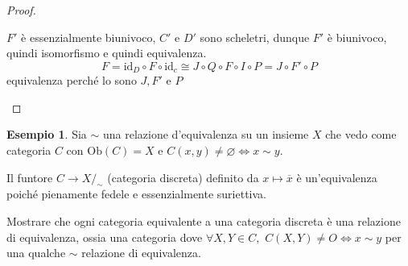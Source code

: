\documentclass[notitlepage]{report}
\newcounter{theo}[section]\setcounter{theo}{0}
\newcounter{excounter}[section]\setcounter{excounter}{0}
\numberwithin{equation}{section}
\theoremstyle{plain}
\theoremstyle{definition}
\newtheorem{example}[excounter]{Esempio}
\theoremstyle{remark}
\begin{document}
\begin{proof}
\begin{itemize}
    \(F'\) è essenzialmente biunivoco, \(C'\) e \(D'\) sono scheletri, dunque \(F'\) è biunivoco, quindi isomorfismo e quindi equivalenza.
    \[
        F = \mathrm{id}_D \circ F \circ \mathrm{id}_c \cong J \circ Q \circ F
        \circ I \circ P = J \circ F' \circ P
    \]
    equivalenza perché lo sono \(J, F'\) e \(P\) 
\end{itemize}
\end{proof}

\begin{example}{}
    Sia \(\sim \) una relazione d'equivalenza su un insieme \(X\) che vedo come
    categoria \(C\) con \(\mathrm{Ob}{(C)} = X\)  e \(C{(x,y)} \neq \varnothing \iff x \sim y\).

    Il funtore \(C \to X/_\sim\) (categoria discreta) definito da \(x \mapsto
    \overline{x}\) è un'equivalenza poiché pienamente fedele e essenzialmente
    suriettiva.
\end{example}

\begin{eser}{}
    Mostrare che ogni categoria equivalente a una categoria discreta è una relazione di
    equivalenza, ossia una categoria dove \(\forall X, Y \in C, \,\,
    C{(X,Y)} \neq O \iff x \sim y \) per una qualche \(\sim \) relazione di
    equivalenza.
\end{eser}
\end{document}
